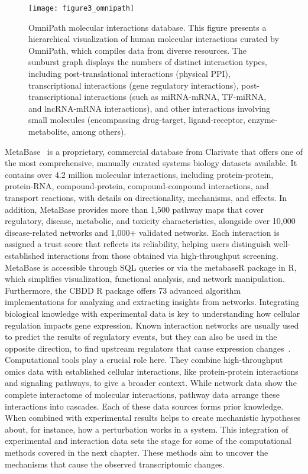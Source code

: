 \begin{figure}[htbp]
    \centering
    \texttt{[image: figure3\_omnipath]}
    \caption{OmniPath molecular interactions database. This figure presents a hierarchical visualization of human molecular interactions curated by OmniPath, which compiles data from diverse resources. The sunburst graph displays the numbers of distinct interaction types, including post-translational interactions (physical \gls{PPI}), transcriptional interactions (gene regulatory interactions), post-transcriptional interactions (such as miRNA-mRNA, \gls{TF}-miRNA, and lncRNA-mRNA interactions), and other interactions involving small molecules (encompassing drug-target, ligand-receptor, enzyme-metabolite, among others).}
    \label{fig:figure3}
\end{figure}

MetaBase~\cite{RN33} is a proprietary, commercial database from Clarivate that offers one of the most comprehensive, manually curated systems biology datasets available. It contains over 4.2 million molecular interactions, including protein-protein, protein-RNA, compound-protein, compound-compound interactions, and transport reactions, with details on directionality, mechanisms, and effects. In addition, MetaBase provides more than 1,500 pathway maps that cover regulatory, disease, metabolic, and toxicity characteristics, alongside over 10,000 disease-related networks and 1,000+ validated networks. Each interaction is assigned a trust score that reflects its reliability, helping users distinguish well-established interactions from those obtained via high-throughput screening. MetaBase is accessible through SQL queries or via the metabaseR package in R, which simplifies visualization, functional analysis, and network manipulation. Furthermore, the CBDD R package offers 73 advanced algorithm implementations for analyzing and extracting insights from networks.
Integrating biological knowledge with experimental data is key to understanding how cellular regulation impacts gene expression.  Known interaction networks are usually used to predict the results of regulatory events, but they can also be used in the opposite direction, to find upstream regulators that cause expression changes~\cite{RN131}. Computational tools play a crucial role here. They combine high-throughput omics data with established cellular interactions, like protein-protein interactions and signaling pathways, to give a broader context. While network data show the complete interactome of molecular interactions, pathway data arrange these interactions into cascades. Each of these data sources forms prior knowledge. 
When combined with experimental results helps to create mechanistic hypotheses about, for instance, how a perturbation works in a system. This integration of experimental and interaction data sets the stage for some of the computational methods covered in the next chapter. These methods aim to uncover the mechanisms that cause the observed transcriptomic changes.

